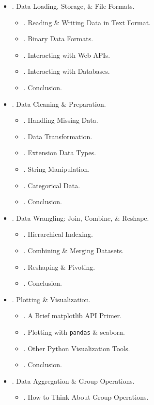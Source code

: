 \documentclass{article}
\begin{document}
\begin{itemize}
\begin{itemize}
	\end{itemize}
	\item {. Data Loading, Storage, \& File Formats.}
	\begin{itemize}
		\item {. Reading \& Writing Data in Text Format.}
		\item {. Binary Data Formats.}
		\item {. Interacting with Web APIs.}
		\item {. Interacting with Databases.}
		\item {. Conclusion.}
	\end{itemize}
	\item {. Data Cleaning \& Preparation.}
	\begin{itemize}
		\item {. Handling Missing Data.}
		\item {. Data Transformation.}
		\item {. Extension Data Types.}
		\item {. String Manipulation.}
		\item {. Categorical Data.}
		\item {. Conclusion.}
	\end{itemize}
	\item {. Data Wrangling: Join, Combine, \& Reshape.}
	\begin{itemize}
		\item {. Hierarchical Indexing.}
		\item {. Combining \& Merging Datasets.}
		\item {. Reshaping \& Pivoting.}
		\item {. Conclusion.}
	\end{itemize}
	\item {. Plotting \& Visualization.}
	\begin{itemize}
		\item {. A Brief matplotlib API Primer.}
		\item {. Plotting with {\tt pandas} \& seaborn.}
		\item {. Other Python Visualization Tools.}
		\item {. Conclusion.}
	\end{itemize}
	\item {. Data Aggregation \& Group Operations.}
	\begin{itemize}
		\item {. How to Think About Group Operations.}

\end{itemize}
\end{itemize}
\end{document}
